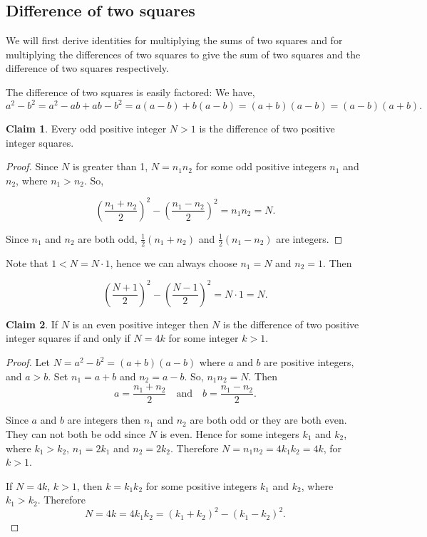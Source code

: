 \documentclass{article}
\theoremstyle{definition}
\newtheorem{claim}{Claim}
\begin{document}
\subsection{Difference of two squares}

We will first derive identities for multiplying the sums of two squares and for multiplying the differences of two squares to give the sum of two squares and the difference of two squares respectively.

The difference of two squares is easily factored: We have, \[ a^2-b^2 = a^2-ab+ab-b^2 = a(a-b)+ b(a-b) = (a+b)(a-b) = (a-b)(a+b). \]

\begin{claim}
Every odd positive integer \(N>1\) is the difference of two positive integer squares.
\end{claim}

\begin{proof}
Since \(N\) is greater than 1, \(N=n_1n_2\) for some odd positive integers \(n_1\) and \(n_2\), where \(n_1>n_2\). So,

\[ \left(\frac{n_1+n_2}{2}\right)^2 - \left(\frac{n_1-n_2}{2}\right)^2 = n_1n_2 = N. \]

Since \(n_1\) and \(n_2\) are both odd,  \(\frac{1}{2}(n_1+n_2)\) and \(\frac{1}{2}(n_1-n_2)\) are integers.
\end{proof}

Note that \(1 < N = N\cdot 1\), hence we can always choose \(n_1=N\) and \(n_2=1\). Then

\[ \left(\frac{N+1}{2}\right)^2 - \left(\frac{N-1}{2}\right)^2 = N\cdot 1 = N. \]

\begin{claim}
If \(N\) is an even positive integer then \(N\) is the difference of two positive integer squares if and only if \(N=4k\) for some integer \(k>1\).
\end{claim}
\begin{proof}
Let \(N=a^2-b^2=(a+b)(a-b)\) where \(a\) and \(b\) are positive integers, and \(a>b\). Set \(n_1=a+b\) and \(n_2=a-b\). So, \(n_1n_2=N\). Then \[ a=\frac{n_1+n_2}{2} \quad\text{and}\quad b=\frac{n_1-n_2}{2}. \]

Since \(a\) and \(b\) are integers then \(n_1\) and \(n_2\) are both odd or they are both even. They can not both be odd since \(N\) is even. Hence for some integers \(k_1\) and \(k_2\), where \(k_1>k_2\), \(n_1=2k_1\) and \(n_2=2k_2\). Therefore \(N=n_1n_2 = 4k_1k_2=4k\), for \(k>1\).

If \(N=4k\), \(k>1\), then \(k=k_1k_2\) for some positive integers \(k_1\) and \(k_2\), where \(k_1>k_2\). Therefore
\[ N = 4k =4 k_1k_2 = (k_1+k_2)^2 - (k_1-k_2)^2. \]
\end{proof}
\end{document}
